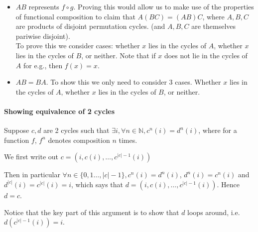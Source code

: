\documentclass{article}
\begin{document}
\begin{itemize}
	\item $AB$ represents $f\circ g$. Proving this would allow us to make use of the properties of functional composition to claim that $A(BC)=(AB)C$, where $A,B,C$ are products of disjoint permutation cycles. (and $A,B,C$ are themselves pariwise disjoint).\\
	To prove this we consider cases: whether $x$ lies in the cycles of $A$, whether $x$ lies in the cycles of $B$, or neither. Note that if $x$ does not lie in the cycles of $A$ for e.g., then $f(x)=x$.
	\item $AB=BA$. To show this we only need to consider 3 cases. Whether $x$ lies in the cycles of $A$, whether $x$ lies in the cycles of $B$, or neither.
\end{itemize}

\paragraph{Showing equivalence of 2 cycles}

Suppose $c, d$ are 2 cycles such that $\exists i, \forall n\in \mathbb{N}, c^n(i) = d^n(i)$, where for a function $f$, $f^n$ denotes composition $n$ times.

We first write out $c = (i, c(i), \dots, c^{|c|-1}(i))$

Then in particular $\forall n\in \{0, 1\dots, |c|-1\}, c^n(i) = d^n(i)$, $d^n(i) = c^n(i)$ and $d^{|c|}(i) = c^{|c|}(i) = i$, which says that $d = (i, c(i), \dots, c^{|c|-1}(i))$. Hence $d=c$.

Notice that the key part of this argument is to show that $d$ loops around, i.e. $d(c^{|c|-1}(i)) = i$.
\end{document}
